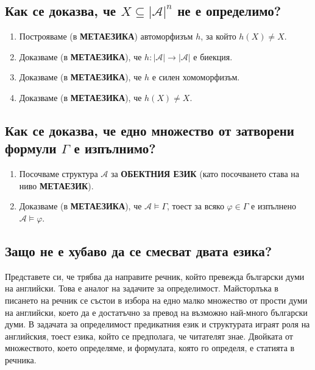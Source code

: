 \documentclass[12pt]{article}
\newcommand{\calA}{\mathcal{A}}
\theoremstyle{definition}
\begin{document}
\subsection*{Как се доказва, че $X \subseteq |\calA|^n$ не е определимо?}
\begin{enumerate}
  \item Построяваме (в \textbf{МЕТАЕЗИКА}) автоморфизъм $h$, за който $h(X) \neq X$.
  \item Доказваме (в \textbf{МЕТАЕЗИКА}), че $h : |\calA| \rightarrow |\calA|$ е биекция.
  \item Доказваме (в \textbf{МЕТАЕЗИКА}), че $h$ е силен хомоморфизъм.
  \item Доказваме (в \textbf{МЕТАЕЗИКА}), че $h(X) \neq X$.
\end{enumerate}

\subsection*{Как се доказва, че едно множество от затворени формули $\Gamma$ е изпълнимо?}
\begin{enumerate}
  \item Посочваме структура $\calA$ за \textbf{ОБЕКТНИЯ ЕЗИК} (като посочването става на ниво \textbf{МЕТАЕЗИК}).
  \item Доказваме (в \textbf{МЕТАЕЗИКА}), че $\calA \models \Gamma$, тоест за всяко $\varphi \in \Gamma$ е изпълнено $\calA \models \varphi$.
\end{enumerate}

\subsection*{Защо не е хубаво да се смесват двата езика?}
Представете си, че трябва да направите речник, който превежда български думи на английски.
Това е аналог на задачите за определимост.
Майсторлъка в писането на речник се състои в избора на едно малко множество от прости думи на английски, което да е достатъчно за превод на възможно най-много български думи.
В задачата за определимост предикатния език и структурата играят роля на английския, тоест езика, който се предполага, че читателят знае.
Двойката от множеството, което определяме, и формулата, която го определя, е статията в речника.

\newpage
\end{document}
